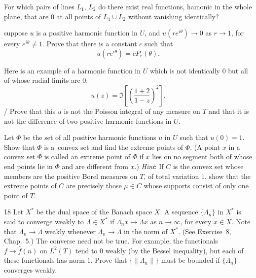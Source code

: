 \begin{enumerate}
\begin{excopy}
For which pairs of lines \(L_1\), \(L_2\) do there exist real functions,
hamonic in the whole plane, that are
$0$ at all points of \(L_1 \cup L_2\) without vanishing identically?
\end{excopy}


\begin{excopy}
suppose $u$ is a positive harmonic function in $U$, 
and \(u(re^{i\theta}) \to 0\) as \(r\to 1\), for every \(e^{i\theta} \neq 1\).
Prove
that there is a constant $c$ such that
\begin{equation*}
u(re^{i\theta}) = cP_r(\theta).
\end{equation*}
\end{excopy}


\begin{excopy}
Here is an example of a harmonic function in $U$ which is not identically $0$ but all of whose radial
limits are $0$:
\begin{equation*}
u(z) = \Im\left[\left(\frac{1+2}{1-z}\right)^2\right].
\end{equation*}/
Prove that this $u$ is not the Poisson integral of any measure on $T$ 
and that it is not the difference of
two positive harmonic functions in $U$.
\end{excopy}


\begin{excopy}
Let \(\Phi\) be the set of all positive harmonic functions $u$ in $U$
 such that \(u(0) = 1\). Show that \(\Phi\) is 
a~convex set and find the extreme points of \(\Phi\). (A point $x$ in a convex
 set \(\Phi\) is called an extreme point of
\(\Phi\) if $x$ lies on no segment both of whose end points lie in \(\Phi\)
 and are different from $x$.) \emph{Hint}: If $C$ is the
convex set whose members are the positive Borel measures on $T$,
 of total variation $1$, show that the
extreme points of $C$ are precisely those \(\mu \in C\)
 whose supports consist of only one point of $T$.
\end{excopy}


\begin{excopy} 18
Let \(X^*\) be the dual space of the Banach space $X$. 
A sequence \(\{\Lambda_n\}\) in \(X^*\) is said to converge weakly
to \(\Lambda \in X^*\) if \(\Lambda_n x \to \Lambda x\) as \(n \to \infty\),
 for every \(x \in X\). Note that \(\Lambda_n \to \Lambda\) weakly whenever
\(\Lambda_n \to \Lambda\) in the
norm of \(X^*\). (See Exercise~8, Chap.~5.) The converse need not be true.
 For example, the functionals
\(f\to \hat{f}(n)\) on \(L^2(T)\) tend to $0$ weakly (by the Bessel inequality),
 but each of these functionals has norm $1$.
Prove that \(\{\| \Lambda_n\|\}\) must be bounded if \(\{\Lambda_n\}\)
 converges weakly.
\end{excopy}



\end{enumerate}

